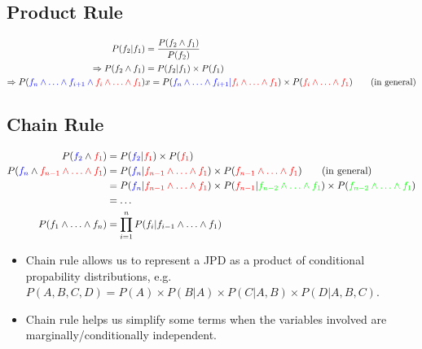 \documentclass{article}
\begin{document}
\subsection{Product Rule}

\begin{align*}
    P(f_2|f_1) &= \frac{P(f_2 \wedge f_1)}{P(f_2)} \\
    \Rightarrow P(f_2 \wedge f_1) &=  P(f_2|f_1) \times P(f_1) \\
    \Rightarrow P(\textcolor{blue}{f_n \wedge \ldots \wedge f_{i + 1} \wedge \textcolor{red}{f_i \wedge \ldots \wedge f_1}}) &x= P(\textcolor{blue}{f_n \wedge \ldots \wedge f_{i + 1} | \textcolor{red}{f_i \wedge \ldots \wedge f_1}}) \times P(\textcolor{red}{f_i \wedge \ldots \wedge f_1}) \tag{in general}
\end{align*}

\subsection{Chain Rule}

\begin{align*}
    P(\textcolor{blue}{f_2} \wedge \textcolor{red}{f_1}) &= P(\textcolor{blue}{f_2}|\textcolor{red}{f_1}) \times P(\textcolor{red}{f_1}) \\
    P(\textcolor{blue}{f_n} \wedge \textcolor{red}{f_{n-1} \wedge \ldots \wedge f_1}) &= P(\textcolor{blue}{f_n} | \textcolor{red}{f_{n-1} \wedge \ldots \wedge f_1}) \times P(\textcolor{red}{f_{n-1} \wedge \ldots \wedge f_1}) \tag{in general} \\
    &= P(\textcolor{blue}{f_n} | \textcolor{red}{f_{n-1} \wedge \ldots \wedge f_1}) \times P(\textcolor{red}{f_{n-1}} | \textcolor{green}{f_{n-2} \wedge \ldots \wedge f_1}) \times P(\textcolor{green}{f_{n-2} \wedge \ldots \wedge f_1}) \\
    &= \ldots \\
    P(f_1 \wedge \ldots \wedge f_n) &= \prod\limits_{i = 1}^{n} P(f_i|f_{i - 1} \wedge \ldots \wedge f_1)
\end{align*}

\begin{itemize}
    \item Chain rule allows us to represent a JPD as a product of conditional propability distributions, e.g. $P(A, B, C, D) = P(A) \times P(B|A) \times P(C|A, B) \times P(D|A, B, C)$.
    \item Chain rule helps us simplify some terms when the variables involved are marginally/conditionally independent.
\end{itemize}
\end{document}
